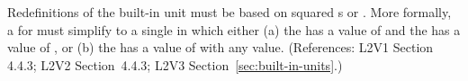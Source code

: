 Redefinitions of the built-in unit  must be based on squared
s or .  More formally, a \UnitDefinition
for  must simplify to a single \Unit in which either (a) the
  has a value of  and the
  has a value of , or (b) the
  has a value of  with
any  value.  (References: L2V1 Section 4.4.3; L2V2
Section~4.4.3; L2V3 Section~\ref{sec:built-in-units}.)
